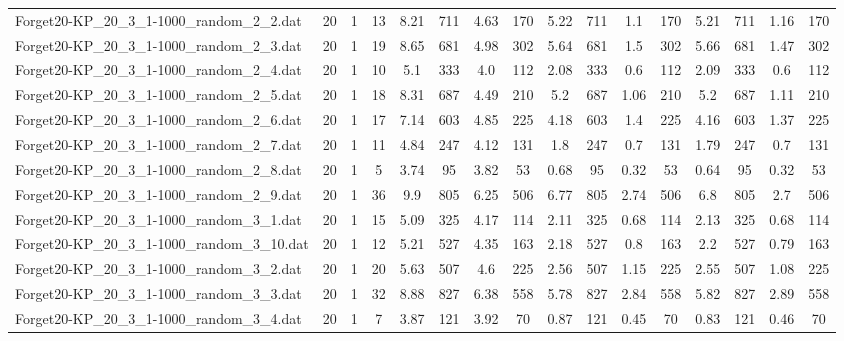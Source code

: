 \begin{sidewaystable}[!ht]
{\begin{tabular}{lccccccccccccccc}
Forget20-KP\_20\_3\_1-1000\_random\_2\_2.dat & 20 & 1 & 13 & 8.21 & 711 & 4.63 & 170 & 5.22 & 711 &  \textcolor{blue2}{1.1} & 170 & 5.21 & 711 & 1.16 & 170 \\
Forget20-KP\_20\_3\_1-1000\_random\_2\_3.dat & 20 & 1 & 19 & 8.65 & 681 & 4.98 & 302 & 5.64 & 681 & 1.5 & 302 & 5.66 & 681 &  \textcolor{blue2}{1.47} & 302 \\
Forget20-KP\_20\_3\_1-1000\_random\_2\_4.dat & 20 & 1 & 10 & 5.1 & 333 & 4.0 & 112 & 2.08 & 333 &  \textcolor{blue2}{0.6} & 112 & 2.09 & 333 &  \textcolor{blue2}{0.6} & 112 \\
Forget20-KP\_20\_3\_1-1000\_random\_2\_5.dat & 20 & 1 & 18 & 8.31 & 687 & 4.49 & 210 & 5.2 & 687 &  \textcolor{blue2}{1.06} & 210 & 5.2 & 687 & 1.11 & 210 \\
Forget20-KP\_20\_3\_1-1000\_random\_2\_6.dat & 20 & 1 & 17 & 7.14 & 603 & 4.85 & 225 & 4.18 & 603 & 1.4 & 225 & 4.16 & 603 &  \textcolor{blue2}{1.37} & 225 \\
Forget20-KP\_20\_3\_1-1000\_random\_2\_7.dat & 20 & 1 & 11 & 4.84 & 247 & 4.12 & 131 & 1.8 & 247 &  \textcolor{blue2}{0.7} & 131 & 1.79 & 247 &  \textcolor{blue2}{0.7} & 131 \\
Forget20-KP\_20\_3\_1-1000\_random\_2\_8.dat & 20 & 1 & 5 & 3.74 & 95 & 3.82 & 53 & 0.68 & 95 &  \textcolor{blue2}{0.32} & 53 & 0.64 & 95 &  \textcolor{blue2}{0.32} & 53 \\
Forget20-KP\_20\_3\_1-1000\_random\_2\_9.dat & 20 & 1 & 36 & 9.9 & 805 & 6.25 & 506 & 6.77 & 805 & 2.74 & 506 & 6.8 & 805 & 2.7 & 506 \\
Forget20-KP\_20\_3\_1-1000\_random\_3\_1.dat & 20 & 1 & 15 & 5.09 & 325 & 4.17 & 114 & 2.11 & 325 &  \textcolor{blue2}{0.68} & 114 & 2.13 & 325 &  \textcolor{blue2}{0.68} & 114 \\
Forget20-KP\_20\_3\_1-1000\_random\_3\_10.dat & 20 & 1 & 12 & 5.21 & 527 & 4.35 & 163 & 2.18 & 527 & 0.8 & 163 & 2.2 & 527 &  \textcolor{blue2}{0.79} & 163 \\
Forget20-KP\_20\_3\_1-1000\_random\_3\_2.dat & 20 & 1 & 20 & 5.63 & 507 & 4.6 & 225 & 2.56 & 507 & 1.15 & 225 & 2.55 & 507 & 1.08 & 225 \\
Forget20-KP\_20\_3\_1-1000\_random\_3\_3.dat & 20 & 1 & 32 & 8.88 & 827 & 6.38 & 558 & 5.78 & 827 &  \textcolor{blue2}{2.84} & 558 & 5.82 & 827 & 2.89 & 558 \\
Forget20-KP\_20\_3\_1-1000\_random\_3\_4.dat & 20 & 1 & 7 & 3.87 & 121 & 3.92 & 70 & 0.87 & 121 &  \textcolor{blue2}{0.45} & 70 & 0.83 & 121 & 0.46 & 70 \\

\end{tabular}}
\end{sidewaystable}
